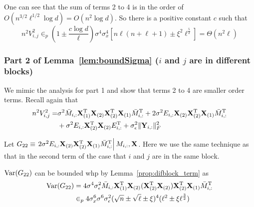 One can see that the sum of terms 2 to 4 is in the order of
 $ O(n^{3/2}\ell^{1/2}\log d) = O(n^2 \log d)$. So there is a positive constant $c$ such that 
\begin{equation}
    n^2V^2_{i,j} 
    \in_{p} (1\pm \frac{c\log d}{\ell})\sigma^4\sigma^4_x[n\ell(n + \ell +1) \pm \xi^2 \ell^{\frac{5}{2}}]
    = \Theta(n^2 \ell)
\end{equation}




\subsubsection{Part 2 of Lemma~\ref{lem:boundSigma} ($i$ and $j$ are in different blocks)}\label{asec:boundpart2}
We mimic the analysis for part 1 and show that terms 2 to 4 are smaller order terms. Recall again that
\begin{equation}
\begin{split}
    n^2 V^2_{i,j} 
    =&  \sigma^2 \bar M_{i, :}\mathbf{X}_{(1)}^{\mathrm{T}}\mathbf{X}_{(2)}\mathbf{X}_{(2)}^{\mathrm{T}}\mathbf{X}_{(1)}\bar M^{\mathrm{T}}_{i, :}   + 2\sigma^2E_{i,:}\mathbf{X}_{(2)}\mathbf{X}^{\mathrm{T}}_{(2)}\mathbf{X}_{(1)}\bar M^{\mathrm{T}}_{i,:}  \\
    &+\sigma^2E_{i,:}\mathbf{X}_{(2)}^{\mathrm{T}}\mathbf{X}_{(2)}E^{\mathrm{T}}_{i,:} + \sigma^2_{\epsilon}\|\mathbf{Y}_{i,:}\|^2_F 
\end{split}
\end{equation}


Let $G_{22} \equiv \left. 2\sigma^2E_{i,:}\mathbf{X}_{(2)}\mathbf{X}^{\mathrm{T}}_{(2)}\mathbf{X}_{(1)}\bar M^{\mathrm{T}}_{i,:}\right|M_{i,:},\mathbf{X}$. Here we use the same technique as that in the second term of the case that $i$ and $j$ are in the same block.

$\mathrm{Var}(G_{22})$ can be bounded whp by Lemma~\ref{prop:difblock_term} as
\begin{equation}
\begin{split}
    \mathrm{Var}(G_{22}) 
    &= 4 \sigma^4 \sigma^2_{\epsilon}  \bar M_{i,:}\mathbf{X}^{\mathrm{T}}_{(1)}\mathbf{X}_{(2)}  (\mathbf{X}^{\mathrm{T}}_{(2)} \mathbf{X}_{(2)})\mathbf{X}^{\mathrm{T}}_{(2)}\mathbf{X}_{(1)}\bar M^{\mathrm{T}}_{i,:}   \\ 
    &\in_p 4\sigma^6_x\sigma^6 \sigma^2_{\epsilon} (\sqrt{n} \pm \sqrt{\ell} \pm \xi)^4(\ell^2  \pm \xi \ell^{\frac{3}{2}}) 
\end{split}
\end{equation}


